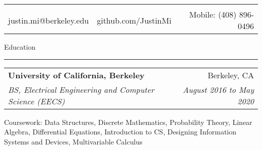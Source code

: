 \documentclass[11pt,letterpaper]{article}
\makeatletter
\newenvironment{topic}[1]
    {
    {\Large \centerline{#1}}
    \vspace*{0.03in}
    \hrule 
    \vspace*{0.05in}
    }
    {}
\newenvironment{event}
    {
    \begin{tabular*}{\textwidth}{l@{\extracolsep{\fill}}r}
    }
    {
    \end{tabular*}
    }
\newenvironment{detail}
    {
    \normalsize
    }
    {
    \vspace*{0.02in}
    }
\newenvironment{head}
    {
    \begin{center}
    \begin{tabular*}{\textwidth}{@{\extracolsep{\fill}} l c r}
    }
    {
    \hline
    \hline
    \end{tabular*}
    \end{center}
    }
\makeatother
\begin{document}
    \begin{head}
                           & \huge{\textbf{\sc{Justin Mi}}} \\
    justin.mi@berkeley.edu  & github.com/JustinMi & Mobile: (408) 896-0496 \\
    \end{head} \vspace*{0.1in}





    \begin{topic}{Education}
        \begin{event}
            \textbf{University of California, Berkeley} & Berkeley, CA \\
            \emph{BS, Electrical Engineering and Computer Science (EECS)} & \emph{August 2016 to May 2020}        
        \end{event}
            \begin{detail}
                Coursework: Data Structures, Discrete Mathematics, Probability Theory,  Linear Algebra, Differential Equations, Introduction to CS, Designing Information Systems and Devices, Multivariable Calculus            
            \end{detail}
    \end{topic} \vspace*{0.1in}
\end{document}
